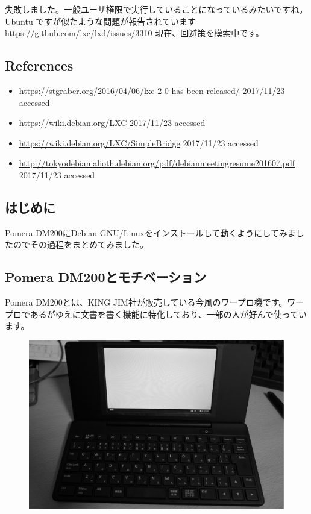 \documentclass[mingoth,a4paper]{jsarticle}
\begin{document}
失敗しました。一般ユーザ権限で実行していることになっているみたいですね。
Ubuntu ですが似たような問題が報告されています \url{https://github.com/lxc/lxd/issues/3310}
現在、回避策を模索中です。

\subsection{References}
\begin{itemize}
\item \url{https://stgraber.org/2016/04/06/lxc-2-0-has-been-released/} 2017/11/23 accessed 
\item \url{https://wiki.debian.org/LXC} 2017/11/23 accessed 
\item \url{https://wiki.debian.org/LXC/SimpleBridge} 2017/11/23 accessed 
\item \url{http://tokyodebian.alioth.debian.org/pdf/debianmeetingresume201607.pdf} 2017/11/23 accessed 
\end{itemize}


\subsection{はじめに}

Pomera DM200にDebian GNU/Linuxをインストールして動くようにしてみましたのでその過程をまとめてみました。


\subsection{Pomera DM200とモチベーション}

Pomera DM200とは、KING JIM社が販売している今風のワープロ機です。ワープロであるがゆえに文書を書く機能に特化しており、一部の人が好んで使っています。

\begin{figure}[h]
  \begin{center}
    \includegraphics[scale=0.5]{image201709/dm200_gray.png}
  \end{center}
\end{figure}
\end{document}
